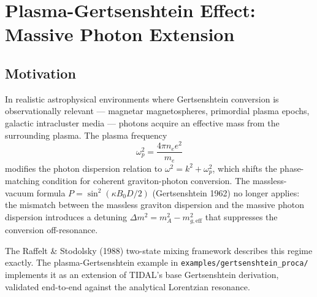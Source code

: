 
\section{Plasma-Gertsenshtein Effect: Massive Photon Extension}
\label{sec:gertsenshtein-proca}

\subsection{Motivation}
\label{subsec:proca-motivation}

In realistic astrophysical environments where Gertsenshtein conversion is
observationally relevant --- magnetar magnetospheres, primordial plasma
epochs, galactic intracluster media --- photons acquire an effective mass
from the surrounding plasma. The plasma frequency
\begin{equation}
  \omega_p^2 = \frac{4\pi n_e e^2}{m_e}
  \label{eq:plasma-frequency}
\end{equation}
modifies the photon dispersion relation to $\omega^2 = k^2 + \omega_p^2$,
which shifts the phase-matching condition for coherent graviton-photon
conversion. The massless-vacuum formula $P = \sin^2(\kappa B_0 D / 2)$
(Gertsenshtein 1962) no longer applies: the mismatch between the massless
graviton dispersion and the massive photon dispersion introduces a
detuning $\Delta m^2 = m_A^2 - m_{g,\mathrm{eff}}^2$ that suppresses the
conversion off-resonance.

The Raffelt \& Stodolsky (1988) two-state mixing framework describes this
regime exactly. The plasma-Gertsenshtein example in
\texttt{examples/gertsenshtein\_proca/} implements it as an extension of
TIDAL's base Gertsenshtein derivation, validated end-to-end against the
analytical Lorentzian resonance.

